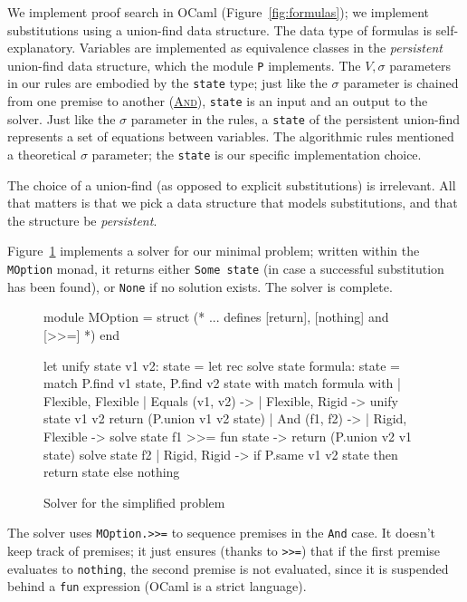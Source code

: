 \documentclass{easychair}
\def\li{\lstinline}
\let\TirName\textsc
\renewcommand{\DefTirName}[1]{\hyperlink{#1}{\TirName {#1}}}
\let\Rule\DefTirName
\newcommand{\fref}[1]{Figure~\ref{fig:#1}}
\begin{document}
We implement proof search in OCaml (\fref{formulas}); we implement substitutions
using a union-find data structure. The data type of formulas
is self-explanatory. Variables are implemented as equivalence classes in the
\emph{persistent} union-find data structure, which the module \li+P+ implements.
The $V, \sigma$ parameters in our rules are embodied by the \li+state+ type; just
like the $\sigma$ parameter is chained from one premise to another (\Rule{And}),
\li+state+ is an input and an output to the solver. Just like the $\sigma$ parameter
in the rules, a \li+state+ of the persistent union-find represents
a set of equations between variables. The algorithmic rules mentioned a
theoretical $\sigma$ parameter; the \li+state+ is our specific implementation
choice.

The choice of a union-find (as opposed to explicit substitutions) is irrelevant.
All that matters is that we pick a data structure that models substitutions, and
that the structure be \emph{persistent}.

\fref{solver} implements a solver for our minimal problem; written within the
\li+MOption+ monad, it returns either \li+Some state+ (in case a successful
substitution has been found), or \li+None+ if no solution exists. The solver is
complete.

\begin{figure}
  \centering
  \begin{ocaml}
module MOption = struct
  (* ... defines [return], [nothing] and [>>=] *)
end

let unify state v1 v2: state =                  let rec solve state formula: state =
  match P.find v1 state, P.find v2 state with     match formula with
  | Flexible, Flexible                            | Equals (v1, v2) ->
  | Flexible, Rigid ->                                unify state v1 v2
      return (P.union v1 v2 state)                | And (f1, f2) ->
  | Rigid, Flexible ->                                solve state f1 >>= fun state ->
      return (P.union v2 v1 state)                    solve state f2
  | Rigid, Rigid ->
      if P.same v1 v2 state then
        return state
      else
        nothing
  \end{ocaml}
  \caption{Solver for the simplified problem}
  \label{fig:solver}
\end{figure}

The solver uses \li+MOption.>>=+ to sequence premises in the \li+And+ case. It
doesn't keep track of premises; it just ensures (thanks to \li+>>=+) that if the
first premise evaluates to \li+nothing+, the second premise is not evaluated,
since it is suspended behind a \li+fun+ expression (OCaml is a strict language).
\end{document}
